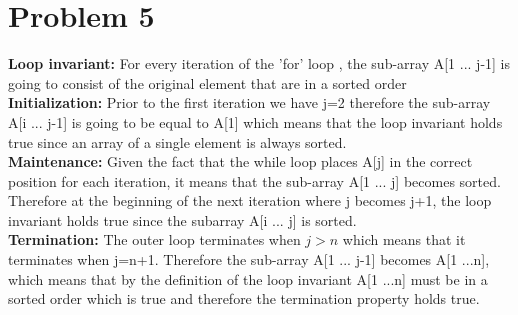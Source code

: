 \documentclass[11pt]{article}
\begin{document}
	\section*{Problem 5}
		\textbf{Loop invariant: } For every iteration of the 'for' loop , the sub-array A[1 ... j-1] is going to consist of the original element that are in a sorted order
		\\
		\textbf{Initialization: } Prior to the first iteration we have j=2 therefore the sub-array A[i ... j-1] is going to be equal to A[1] which means that the loop invariant holds true since an array of a single element is always sorted.
		\\
		\textbf{Maintenance:} Given the fact that the while loop places A[j] in the correct position for each iteration, it means that the sub-array A[1 ... j] becomes sorted. Therefore at the beginning of the next iteration where j becomes j+1, the loop invariant holds true since the subarray A[i ... j] is sorted. 
		\\
		\textbf{Termination:} The outer loop terminates when $j > n$ which means that it terminates when j=n+1. Therefore the sub-array A[1 ... j-1] becomes A[1 ...n], which means that by the definition of the loop invariant A[1 ...n] must be in a sorted order which is true and therefore the termination property holds true.
		\\
\end{document}
